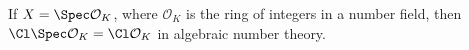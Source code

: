 If $X = \Spec \mathcal{O}_K$, where $\mathcal{O}_K$ is the ring of integers
in a number field, then $\Cl \Spec \mathcal{O}_K = \Cl \mathcal{O}_K$ in algebraic
number theory.

